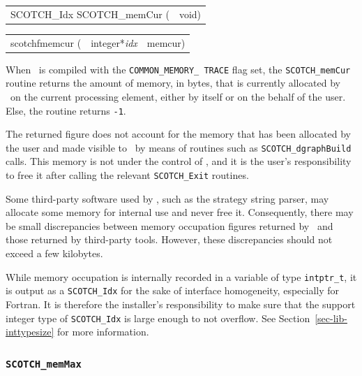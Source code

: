 \begin{itemize}
\progsyn

{\tt\begin{tabular}{l@{}l}
SCOTCH\_Idx SCOTCH\_memCur ( & void)
\end{tabular}}

{\tt\begin{tabular}{l@{}ll}
scotchfmemcur ( & integer*{\it idx} & memcur) \\

\end{tabular}}

\progdes

When \scotch\ is compiled with the {\tt COMMON\_\lbt MEMORY\_\lbt
TRACE} flag set, the {\tt SCOTCH\_memCur} routine returns the amount
of memory, in bytes, that is currently allocated by \scotch\ on the
current processing element, either by itself or on the behalf of the
user. Else, the routine returns {\tt -1}.

The returned figure does not account for the memory that has been
allocated by the user and made visible to \scotch\ by means of
routines such as {\tt SCOTCH\_\lbt dgraph\lbt Build} calls. This
memory is not under the control of \scotch, and it is the user's
responsibility to free it after calling the relevant
{\tt SCOTCH\_\lbt *\lbt Exit} routines.

Some third-party software used by \scotch, such as the strategy string
parser, may allocate some memory for internal use and never free it.
Consequently, there may be small discrepancies between memory
occupation figures returned by \scotch\ and those returned by
third-party tools. However, these discrepancies should not exceed a
few kilobytes.

While memory occupation is internally recorded in a variable of type
{\tt intptr\_\lbt t}, it is output as a {\tt SCOTCH\_\lbt Idx} for the
sake of interface homogeneity, especially for Fortran. It is therefore
the installer's responsibility to make sure that the support integer
type of {\tt SCOTCH\_\lbt Idx} is large enough to not overflow. See
Section~\ref{sec-lib-inttypesize} for more information.
\end{itemize}

\subsubsection{{\tt SCOTCH\_memMax}}

